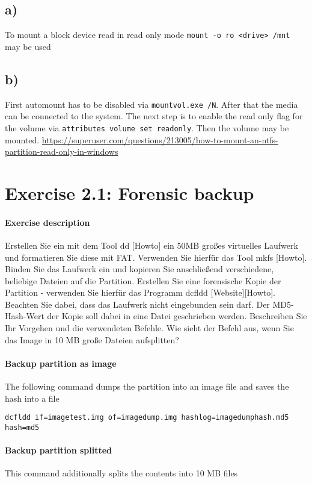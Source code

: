 \documentclass[10pt,a4paper]{article}
\begin{document}
\subsection{a)}
To mount a block device read in read only mode \Verb+mount -o ro <drive> /mnt+ may be used
\subsection{b)}
First automount has to be disabled via \Verb+mountvol.exe /N+. After that the media can be connected to the system. The next step is to enable the read only flag for the volume via \Verb+attributes volume set readonly+. Then the volume may be mounted.
\url{https://superuser.com/questions/213005/how-to-mount-an-ntfs-partition-read-only-in-windows}

\section{Exercise 2.1: Forensic backup}
\paragraph{Exercise description}
Erstellen Sie ein mit dem Tool dd [Howto] ein 50MB großes virtuelles Laufwerk und formatieren Sie diese mit FAT.
Verwenden Sie hierfür das Tool mkfs [Howto]. Binden Sie das Laufwerk ein und kopieren Sie anschließend verschiedene,
beliebige Dateien auf die Partition.
Erstellen Sie eine forensische Kopie der Partition - verwenden Sie hierfür das Programm dcfldd [Website][Howto].
Beachten Sie dabei, dass das Laufwerk nicht eingebunden sein darf. Der MD5-Hash-Wert der Kopie soll dabei in eine Datei
geschrieben werden. Beschreiben Sie Ihr Vorgehen und die verwendeten Befehle. Wie sieht der Befehl aus, wenn Sie das
Image in 10 MB große Dateien aufsplitten?
\paragraph{Backup partition as image}
The following command dumps the partition into an image file and saves the hash into a file

\Verb+dcfldd if=imagetest.img of=imagedump.img hashlog=imagedumphash.md5 hash=md5+
\paragraph{Backup partition splitted}
This command additionally splits the contents into 10 MB files
\end{document}

